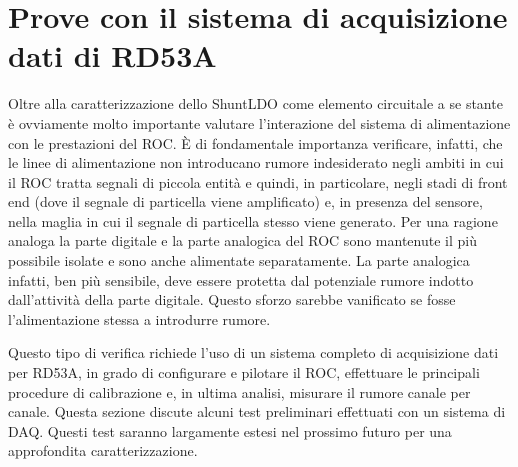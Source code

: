 
\section{Prove con il sistema di acquisizione dati di RD53A}

Oltre alla caratterizzazione dello ShuntLDO come elemento circuitale a se stante \`e ovviamente molto importante valutare l'interazione del sistema di alimentazione con le prestazioni del ROC. \`E di fondamentale importanza verificare, infatti, che le linee di alimentazione non introducano rumore indesiderato negli ambiti in cui il ROC tratta segnali di piccola entit\`a e quindi, in particolare, negli stadi di front end (dove il segnale di particella viene amplificato) e, in presenza del sensore, nella maglia in cui il segnale di particella stesso viene generato. Per una ragione analoga la parte digitale e la parte analogica del ROC sono mantenute il pi\`u possibile isolate e sono anche alimentate separatamente. La parte analogica infatti, ben più sensibile, deve essere protetta dal potenziale rumore indotto dall'attivit\`a della parte digitale. Questo sforzo sarebbe vanificato se fosse l'alimentazione stessa a introdurre rumore.

Questo tipo di verifica richiede l'uso di un sistema completo di acquisizione dati per RD53A, in grado di configurare e pilotare il ROC, effettuare le principali procedure di calibrazione e, in ultima analisi, misurare il rumore canale per canale. Questa sezione discute alcuni test preliminari effettuati con un sistema di DAQ. Questi test saranno largamente estesi nel prossimo futuro per una approfondita caratterizzazione.

